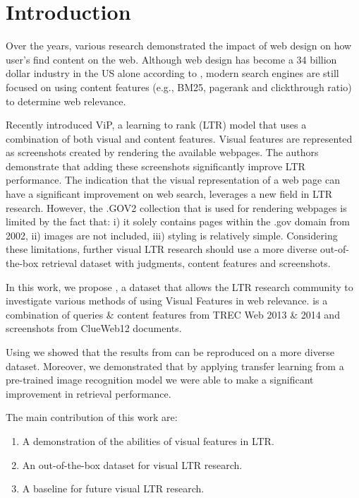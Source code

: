 

\section{Introduction}
Over the years, various research demonstrated the impact of web design on how user's find content on the web\cite{nielsen1999designing}\cite{nielsen2006f}\cite{pernice2017f}.  Although web design has become a 34 billion dollar industry in the US alone according to \citet{ibisdesign}, modern search engines are still focused on using content features (e.g., BM25, pagerank and clickthrough ratio) to determine web relevance. 

Recently \citet{fan2017learning} introduced ViP, a learning to rank (LTR) model that uses a combination of both visual and content features. Visual features are represented as screenshots created by rendering the available webpages. The authors demonstrate that adding these screenshots significantly improve LTR performance. The indication that the visual representation of a web page can have a significant improvement on web search, leverages a new field in LTR research. 
However, the .GOV2 collection that is used for rendering webpages is limited by the fact that: i) it solely contains pages within the .gov domain from 2002, ii) images are not included, iii) styling is relatively simple. Considering these limitations, further visual LTR research should use a more diverse out-of-the-box retrieval dataset with judgments, content features and screenshots. 

In this work, we propose \datasetname, a dataset that allows the LTR research community to investigate various methods of using Visual Features in web relevance. \datasetname is a combination of queries \& content features from TREC Web 2013 \& 2014 and screenshots from ClueWeb12 documents. 

Using \datasetname we showed that the results from \citet{fan2017learning} can be reproduced on a more diverse dataset. Moreover, we demonstrated that by applying transfer learning from a pre-trained image recognition model we were able to make a significant improvement in retrieval performance. 

The main contribution of this work are:
\begin{enumerate}  
\item A demonstration of the abilities of visual features in LTR.
\item An out-of-the-box dataset for visual LTR research.
\item A baseline for future visual LTR research.
\end{enumerate}

